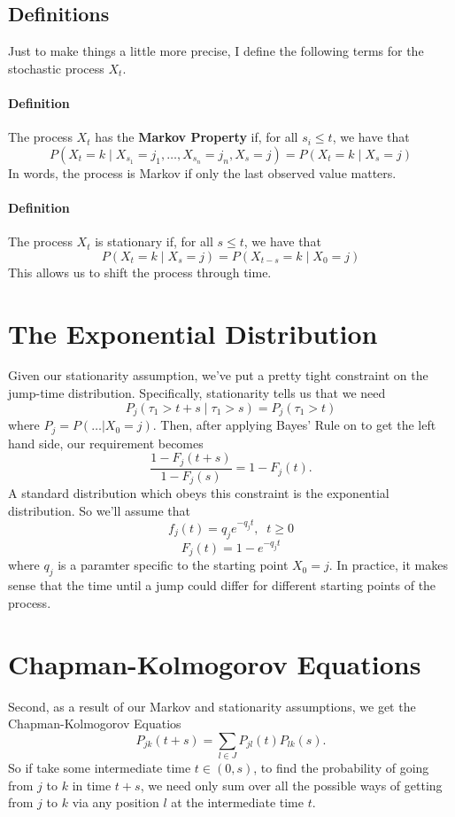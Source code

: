 \documentclass[a4paper,11pt]{scrartcl}
\begin{document}
\subsection{Definitions}

Just to make things a little more precise, I define the following 
terms for the stochastic process $X_t$.

\paragraph{Definition} The process $X_t$ has the \textbf{Markov Property}
if, for all $s_i \leq t$, we have that
   \[ P(X_t = k \; | \; X_{s_1} = j_1, \ldots, X_{s_n} = j_n, 
      X_{s} = j) = P(X_t = k \; | \; X_s = j) \]
In words, the process is Markov if only the last observed value matters.

\paragraph{Definition} The process $X_t$ is stationary if, for all
$s \leq t$, we have that
   \[ P(X_t = k \; | \; X_s = j) = P(X_{t-s} = k \; | \; X_0 = j) 
      \]
This allows us to shift the process through time.
	

\section{The Exponential Distribution}

Given our stationarity assumption, we've put a pretty tight constraint 
on the jump-time distribution. Specifically, stationarity tells us 
that we need
   \[ P_j(\tau_1 > t+s \;|\; \tau_1 > s) = P_j(\tau_1 > t) \]
where $P_j = P(\ldots|X_0 = j)$. Then, after applying Bayes' Rule on 
to get the left hand side, our requirement becomes
  \[ \frac{1 - F_j(t+s)}{1 - F_j(s)} = 1 - F_j(t). \]
A standard distribution which obeys this constraint is the exponential
distribution.  So we'll assume that 	
  \[ f_j(t) = q_j e^{-q_j t}, \;\; t \geq 0 \]
  \[ F_j(t) = 1 - e^{-q_j t} \]
where $q_j$ is a paramter specific to the starting point $X_0 =j$.  In 
practice, it makes sense that the time until a jump could differ for 
different starting points of the process.

\section{Chapman-Kolmogorov Equations}

Second, as a result of our Markov and stationarity assumptions, we get 
the Chapman-Kolmogorov Equatios
     \[ P_{jk}(t+s) = \sum_{l \in J} P_{jl}(t) P_{lk}(s). \]
So if take some intermediate time $t \in (0,s)$, to find the probability 
of going from $j$ to $k$ in time $t+s$, we need only sum over all the 
possible ways of getting from $j$ to $k$ via any position $l$ at the 
intermediate time $t$.  
\end{document}
